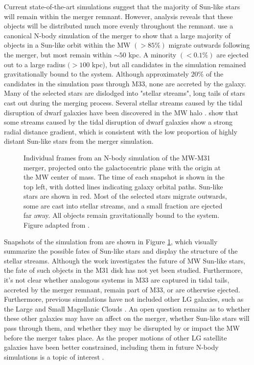 \documentclass[twocolumn]{aastex631}
\begin{document}
Current state-of-the-art simulations suggest that the majority of Sun-like stars will remain within the merger remnant. However, analysis reveals that these objects will be distributed much more evenly throughout the remnant. \citet{2012ApJ...753....9V} use a canonical N-body simulation of the merger to show that a large majority of objects in a Sun-like orbit within the MW $(>85\%)$ migrate outwards following the merger, but most remain within $\sim 50$ kpc. A minority $(<0.1\%)$ are ejected out to a large radius $(>100$ kpc), but all candidates in the simulation remained gravitationally bound to the system. Although approximately $20\%$ of the candidates in the simulation pass through M33, none are accreted by the galaxy. Many of the selected stars are dislodged into "stellar streams", long tails of stars cast out during the merging process. Several stellar streams caused by the tidal disruption of dwarf galaxies have been discovered in the MW halo \citep[and references therein]{2006ApJ...642L.137B}. \citet{2014ApJ...787...19M} show that some streams caused by the tidal disruption of dwarf galaxies show a strong radial distance gradient, which is consistent with the low proportion of highly distant Sun-like stars from the merger simulation.

\begin{figure}[ht!]
\caption{Individual frames from an N-body simulation of the MW-M31 merger, projected onto the galactocentric plane with the origin at the MW center of mass. The time of each snapshot is shown in the top left, with dotted lines indicating galaxy orbital paths. Sun-like stars are shown in red. Most of the selected stars migrate outwards, some are cast into stellar streams, and a small fraction are ejected far away. All objects remain gravitationally bound to the system. Figure adapted from \citet{2012ApJ...753....9V}.
\label{fig1}}
\end{figure}

Snapshots of the simulation from \citet{2012ApJ...753....9V} are shown in Figure \ref{fig1}, which visually summarize the possible fates of Sun-like stars and display the structure of the stellar streams. Although the work investigates the future of MW Sun-like stars, the fate of such objects in the M31 disk has not yet been studied. Furthermore, it's not clear whether analogous systems in M33 are captured in tidal tails, accreted by the merger remnant, remain part of M33, or are otherwise ejected. Furthermore, previous simulations have not included other LG galaxies, such as the Large and Small Magellanic Clouds \citep{1996ApJ...462..576D}\citep{2008MNRAS.386..461C}\citep{2012ApJ...753....9V}. An open question remains as to whether these other galaxies may have an affect on the merger, whether Sun-like stars will pass through them, and whether they may be disrupted by or impact the MW before the merger takes place. As the proper motions of other LG satellite galaxies have been better constrained, including them in future N-body simulations is a topic of interest \citep{2015IAUS..311....1V}.
\end{document}
